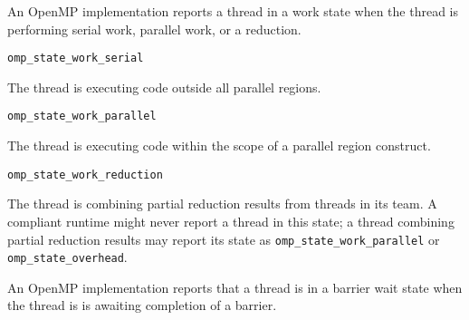 An OpenMP implementation reports a thread in a work state 
when the thread is performing serial work, parallel work, or a reduction.

\begin{description}

\item \verb|omp_state_work_serial| 

  The thread is executing code outside all parallel regions. 

\item \verb|omp_state_work_parallel| 

  The thread is executing code within the scope of a parallel region construct.

\sloppy
\item \verb|omp_state_work_reduction| 
 
  The thread is combining partial reduction results from threads in its team. A compliant
  runtime might never report a thread in this state; a thread
  combining partial reduction results may  report its state as
  \verb|omp_state_work_parallel| or \verb|omp_state_overhead|.

\end{description}



An OpenMP implementation reports that a thread is in a barrier wait state 
when the thread is is awaiting completion of a barrier.


